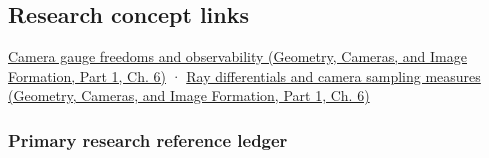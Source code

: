 \subsection{Research concept links}\label{02-foundations-ii-ch039-research-concept-links}

\hypertarget{02-foundations-ii-ch039-research-concept-links}{}

\href{../03-Geometry-Cameras-and-Image-Formation-P01/main.pdf\#nameddest=02-foundations-ii-ch037-a-camera-model-must-close-the-loop}{Camera gauge freedoms and observability (Geometry, Cameras, and Image Formation, Part 1, Ch. 6)} · \href{../03-Geometry-Cameras-and-Image-Formation-P01/main.pdf\#nameddest=02-foundations-ii-ch037-a-camera-model-must-close-the-loop}{Ray differentials and camera sampling measures (Geometry, Cameras, and Image Formation, Part 1, Ch. 6)}

\subsubsection{Primary research reference ledger}\label{02-foundations-ii-ch039-primary-research-reference-ledger}

\hypertarget{02-foundations-ii-ch039-primary-research-reference-ledger}{}

